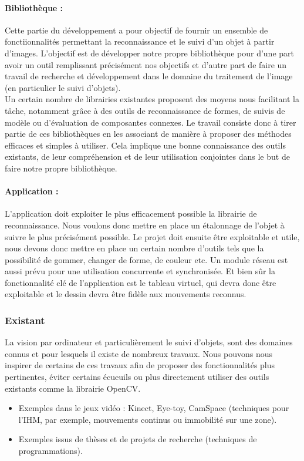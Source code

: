 \documentclass{report}
\begin{document}
			\paragraph{Bibliothèque :\\}
				Cette partie du développement a pour objectif de fournir un ensemble de fonctiionnalités permettant la reconnaissance et le suivi d'un objet à partir d'images. 
				L'objectif est de développer notre propre bibliothèque pour d'une part avoir un outil remplissant précisément nos objectifs et d'autre part de faire un travail de recherche et développement dans le domaine du traitement de l'image (en particulier le suivi d'objets). \\
				Un certain nombre de librairies existantes proposent des moyens nous facilitant la tâche, notamment grâce à des outils de reconnaissance de formes, de suivis de modèle ou d'évaluation de composantes connexes. 
				Le travail consiste donc à tirer partie de ces bibliothèques en les associant de manière à proposer des méthodes efficaces et simples à utiliser. Cela implique une bonne connaissance des outils existants, de leur compréhension et de leur utilisation conjointes dans le but de faire notre propre bibliothèque. \\
			\paragraph{Application :\\}
L'application doit exploiter le plus efficacement possible la librairie de reconnaissance. Nous voulons donc mettre en place un étalonnage de l'objet à suivre le plus précisément possible. Le projet doit ensuite être exploitable et utile, nous devons donc mettre en place un certain nombre d'outils tels que la possibilité de gommer, changer de forme, de couleur etc. 
Un module réseau est aussi prévu pour une utilisation concurrente et synchronisée. Et bien sûr la fonctionnalité clé de l'application est le tableau virtuel, qui devra donc être exploitable et le dessin devra être fidèle aux mouvements reconnus.
		\subsubsection{Existant}
		La vision par ordinateur et particulièrement le suivi d'objets, sont des domaines connus et pour lesquels il existe de nombreux travaux. Nous pouvons nous inspirer de certains de ces travaux afin de proposer des fonctionnalités plus pertinentes, éviter certains écueuils ou plus directement utiliser des outils existants comme la librairie OpenCV.\\
			\begin{itemize}
				\item Exemples dans le jeux vidéo : Kinect, Eye-toy, CamSpace (techniques pour l'IHM, par exemple, mouvements continus ou immobilité sur une zone).
				\item Exemples issus de thèses et de projets de recherche (techniques de programmations).
			\end{itemize}
\end{document}
